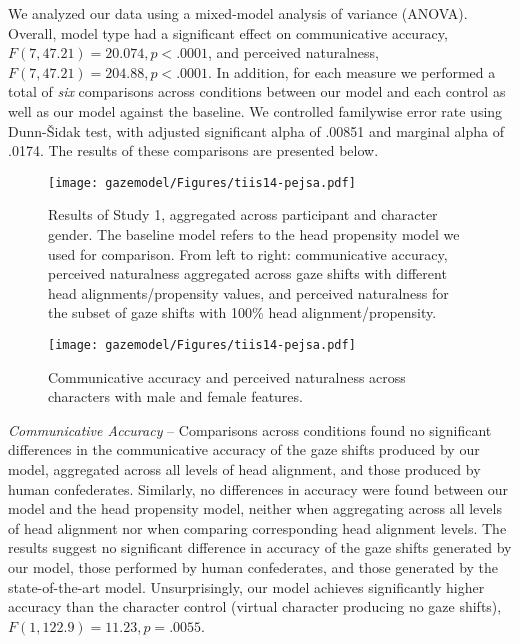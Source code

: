 We analyzed our data using a mixed-model analysis of variance (ANOVA). Overall, model type had a significant effect on communicative accuracy, $F(7, 47.21) = 20.074, p < .0001$, and perceived naturalness, $F(7, 47.21) = 204.88, p < .0001$. In addition, for each measure we performed a total of \emph{six} comparisons across conditions between our model and each control as well as our model against the baseline. We controlled familywise error rate using Dunn-\v{S}idak test, with adjusted significant alpha of .00851 and marginal alpha of .0174. The results of these comparisons are presented below.

\begin{figure}[t]
  \centering
  \texttt{[image: gazemodel/Figures/tiis14-pejsa.pdf]}
  \caption{Results of Study 1, aggregated across participant and character gender. The baseline model refers to the head propensity model we used for comparison. From left to right: communicative accuracy, perceived naturalness aggregated across gaze shifts with different head alignments/propensity values, and perceived naturalness for the subset of gaze shifts with 100\% head alignment/propensity.}
  \label{fig:ModelEvalResults}
\end{figure}

\begin{figure}[t]
  \centering
  \texttt{[image: gazemodel/Figures/tiis14-pejsa.pdf]}
  \caption{Communicative accuracy and perceived naturalness across characters with male and female features.}
  \label{fig:ModelEvalResultsGender}
\end{figure}

\emph{Communicative Accuracy} -- Comparisons across conditions found no significant differences in the communicative accuracy of the gaze shifts produced by our model, aggregated across all levels of head alignment, and those produced by human confederates. Similarly, no differences in accuracy were found between our model and the head propensity model, neither when aggregating across all levels of head alignment nor when comparing corresponding head alignment levels. The results suggest no significant difference in accuracy of the gaze shifts generated by our model, those performed by human confederates, and those generated by the state-of-the-art model. Unsurprisingly, our model achieves significantly higher accuracy than the character control (virtual character producing no gaze shifts), $F(1, 122.9) = 11.23, p = .0055$.

